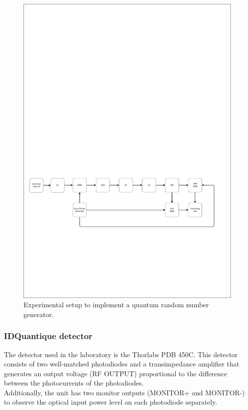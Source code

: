 \begin{figure}[H]
    \centering
        \includegraphics[clip, trim=0.5cm 7cm 0.5cm 17cm, width=1.00\textwidth]{./sdf/quantum_random_number_generator/figures/experimental_qrng.pdf}
    \caption{Experimental setup to implement a quantum random number generator.}\label{experimental_qrng}
\end{figure}

\subsubsection{IDQuantique detector}
%
The detector used in the laboratory is the Thorlabs PDB 450C. This detector consists of two well-matched photodiodes and a transimpedance amplifier that generates an output voltage (RF OUTPUT) proportional to the difference between the photocurrents of the photodiodes.\\
Additionally, the unit has two monitor outputs (MONITOR+ and MONITOR-) to observe the optical input power level on each photodiode separately.

